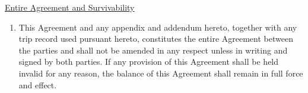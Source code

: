 \underline{Entire Agreement and Survivability}
\begin{enumerate}[
    ref = \SecondLevelEnumerator
]
    \item This Agreement and any appendix and addendum hereto, together
    with any trip record used pursuant hereto, constitutes the entire
    Agreement between the parties and shall not be amended in any respect
    unless in writing and signed by both parties. If any provision of this
    Agreement shall be held invalid for any reason, the balance of this
    Agreement shall remain in full force and effect.
\end{enumerate}